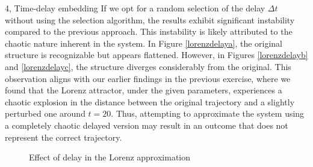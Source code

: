 \begin{task}{4, Time-delay embedding}
If we opt for a random selection of the delay \(\Delta t\) without using the selection algorithm, the results exhibit significant instability compared to the previous approach. This instability is likely attributed to the chaotic nature inherent in the system. In Figure \ref{lorenzdelaya}, the original structure is recognizable but appears flattened. However, in Figures \ref{lorenzdelayb} and \ref{lorenzdelayc}, the structure diverges considerably from the original. This observation aligns with our earlier findings in the previous exercise, where we found that the Lorenz attractor, under the given parameters, experiences a chaotic explosion in the distance between the original trajectory and a slightly perturbed one around \(t = 20\). Thus, attempting to approximate the system using a completely chaotic delayed version may result in an outcome that does not represent the correct trajectory.
\begin{figure}[H]
\centering
{}
\caption{Effect of delay in the Lorenz approximation}
\label{lorenzdelay}
\end{figure}


\end{task}
